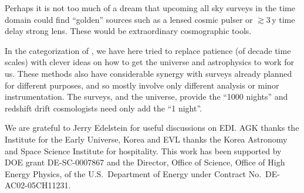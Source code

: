 \documentclass[preprint]{aastex}
\begin{document}
Perhaps it is not too much of a dream that upcoming all sky surveys in the 
time domain could find ``golden'' sources such as a lensed cosmic pulser 
or $\gtrsim3\,$y time delay strong lens.  These would be extraordinary 
cosmographic tools. 

In the categorization of \cite{stebbins}, we have here tried to replace 
patience (of decade time scales) with clever ideas on how to get the 
universe and astrophysics to work for us.  These methods also have 
considerable synergy with surveys already planned for different purposes, 
and so mostly involve only different analysis or minor instrumentation. 
The surveys, and the universe, provide the ``1000 nights'' and redshift 
drift cosmologists need only add the ``1 night''. 


\acknowledgments 

We are grateful to Jerry Edelstein for useful discussions on EDI.  AGK 
thanks the Institute for the Early Universe, Korea and EVL thanks the 
Korea Astronomy and Space Science Institute for hospitality. 
This work has been supported by DOE grant DE-SC-0007867 and the Director, 
Office of Science, Office of High Energy Physics, 
of the U.S.\ Department of Energy under Contract No.\ DE-AC02-05CH11231. 




\end{document}
